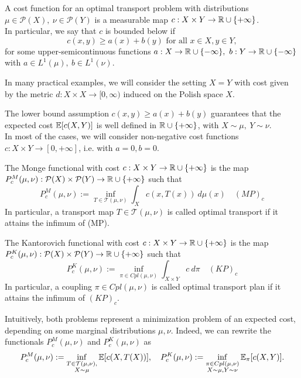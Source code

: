\documentclass[../main.tex]{subfiles}
\begin{document}
\begin{definition}
    A cost function for an optimal transport problem with distributions $\mu\in\mathcal{P}(X), \ \nu\in\mathcal{P}(Y)$ is a measurable map $c:X\times Y\to\mathbb{R}\cup\{+\infty\}$. \\
    In particular, we say that $c$ is bounded below if $$c(x, y)\geq a(x) + b(y) \text{ for all } x\in X, y\in Y, $$ for some upper-semicontinuous functions $a: X\to \mathbb{R}\cup\{-\infty\}, \ b: Y\to \mathbb{R}\cup\{-\infty\}$ with $a\in L^1(\mu), \ b\in L^1(\nu)$.
\end{definition}

In many practical examples, we will consider the setting $X=Y$ with cost given by the metric $d: X\times X\to [0, \infty)$ induced on the Polish space $X$.

\begin{remark}
    The lower bound assumption $c(x, y)\geq a(x) + b(y)$ guarantees that the expected cost $\mathbb{E}[c(X, Y)]$ is well defined in $\mathbb{R}\cup\{+\infty\}$, with $X\sim \mu, \ Y \sim \nu$. \\
    In most of the cases, we will consider non-negative cost functions $c: X\times Y\to[0, +\infty]$, i.e. with $a=0, b=0$.
\end{remark}

\begin{definition}
    The Monge functional with cost $c:X\times Y\to\mathbb{R}\cup\{+\infty\}$ is the map $P^M_c(\mu, \nu): \mathcal{P}(X)\times\mathcal{P}(Y)\to\mathbb{R}\cup\{+\infty\}$ such that
    $$
    P^M_c(\mu, \nu) := \inf_{T\in\mathcal{T}(\mu, \nu)} \int_X c(x, T(x)) \ d\mu(x) 
    \quad (MP)_c
    $$
    In particular, a transport map $T\in\mathcal{T}(\mu, \nu)$ is called optimal transport if it attains the infimum of (MP).
\end{definition}

\begin{definition}
    The Kantorovich functional with cost $c:X\times Y\to\mathbb{R}\cup\{+\infty\}$ is the map $P^K_c(\mu, \nu): \mathcal{P}(X)\times\mathcal{P}(Y)\to\mathbb{R}\cup\{+\infty\}$ such that
    $$
    P^K_c(\mu, \nu) := \inf_{\pi\in Cpl(\mu, \nu)} \int_{X\times Y} c \ d\pi 
    \quad (KP)_c
    $$
    In particular, a coupling $\pi\in Cpl(\mu, \nu)$ is called optimal transport plan if it attains the infimum of $(KP)_c$.
\end{definition}

Intuitively, both problems represent a minimization problem of an expected cost, depending on some marginal distributions $\mu, \nu$. Indeed, we can rewrite the functionals $P^M_c(\mu, \nu)$ and $P^K_c(\mu, \nu)$ as
$$
P^M_c(\mu, \nu) := \inf_{\substack{T\in\mathcal{T}(\mu, \nu), \\ X\sim\mu}} \mathbb{E}[c(X, T(X))], 
\quad 
P^K_c(\mu, \nu) := \inf_{\substack{\pi\in Cpl(\mu, \nu) \\ X\sim\mu, Y\sim\nu}} \mathbb{E}_\pi[c(X, Y)].
$$
\end{document}
